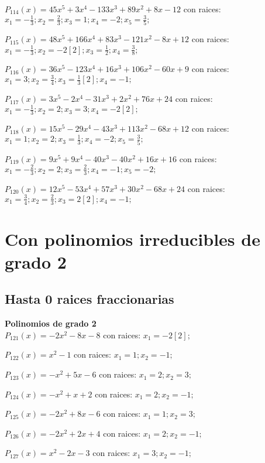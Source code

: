 \subitem $P_{114}(x) = 45x^5 + 3x^4 - 133x^3 + 89x^2 + 8x - 12$ con raices: $x_1 = -\frac{1}{3} ; x_2 = \frac{2}{3} ; x_3 = 1 ; x_4 = -2 ; x_5 = \frac{3}{5} ;  $

\subitem $P_{115}(x) = 48x^5 + 166x^4 + 83x^3 - 121x^2 - 8x + 12$ con raices: $x_1 = -\frac{1}{3} ; x_2 = -2[2] ; x_3 = \frac{1}{2} ; x_4 = \frac{3}{8} ;  $

\subitem $P_{116}(x) = 36x^5 - 123x^4 + 16x^3 + 106x^2 - 60x + 9$ con raices: $x_1 = 3 ; x_2 = \frac{3}{4} ; x_3 = \frac{1}{3}[2] ; x_4 = -1 ;  $

\subitem $P_{117}(x) = 3x^5 - 2x^4 - 31x^3 + 2x^2 + 76x + 24$ con raices: $x_1 = -\frac{1}{3} ; x_2 = 2 ; x_3 = 3 ; x_4 = -2[2] ;  $

\subitem $P_{118}(x) = 15x^5 - 29x^4 - 43x^3 + 113x^2 - 68x + 12$ con raices: $x_1 = 1 ; x_2 = 2 ; x_3 = \frac{1}{3} ; x_4 = -2 ; x_5 = \frac{3}{5} ;  $

\subitem $P_{119}(x) = 9x^5 + 9x^4 - 40x^3 - 40x^2 + 16x + 16$ con raices: $x_1 = -\frac{2}{3} ; x_2 = 2 ; x_3 = \frac{2}{3} ; x_4 = -1 ; x_5 = -2 ;  $

\subitem $P_{120}(x) = 12x^5 - 53x^4 + 57x^3 + 30x^2 - 68x + 24$ con raices: $x_1 = \frac{3}{4} ; x_2 = \frac{2}{3} ; x_3 = 2[2] ; x_4 = -1 ;  $

\section{Con polinomios irreducibles de grado 2}
\subsection{Hasta 0 raices fraccionarias}
\textbf{Polinomios de grado 2\\} 
\subitem $P_{121}(x) = -2x^2 - 8x - 8$ con raices: $x_1 = -2[2] ;  $

\subitem $P_{122}(x) = x^2 - 1$ con raices: $x_1 = 1 ; x_2 = -1 ;  $

\subitem $P_{123}(x) = -x^2 + 5x - 6$ con raices: $x_1 = 2 ; x_2 = 3 ;  $

\subitem $P_{124}(x) = -x^2 + x + 2$ con raices: $x_1 = 2 ; x_2 = -1 ;  $

\subitem $P_{125}(x) = -2x^2 + 8x - 6$ con raices: $x_1 = 1 ; x_2 = 3 ;  $

\subitem $P_{126}(x) = -2x^2 + 2x + 4$ con raices: $x_1 = 2 ; x_2 = -1 ;  $

\subitem $P_{127}(x) = x^2 - 2x - 3$ con raices: $x_1 = 3 ; x_2 = -1 ;  $

